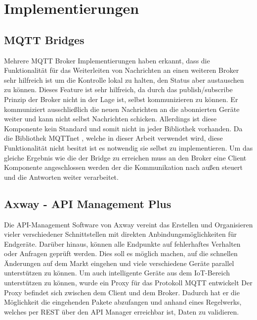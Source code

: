 \section{Implementierungen}
    \subsection{MQTT Bridges}
    Mehrere MQTT Broker Implementierungen \cite{84codes_ab_2016} \cite{light_2019}
    haben erkannt, dass die Funktionalität für das Weiterleiten von Nachrichten an einen weiteren Broker sehr hilfreich ist um die Kontrolle lokal zu halten, den Status aber austauschen zu können. Dieses Feature ist sehr hilfreich, da durch das publish/subscribe Prinzip der Broker nicht in der Lage ist, selbst kommunizieren zu können. Er kommuniziert ausschließlich die neuen Nachrichten an die abonnierten Geräte weiter und kann nicht selbst Nachrichten schicken. Allerdings ist diese Komponente kein Standard und somit nicht in jeder Bibliothek vorhanden.
    Da die Bibliothek MQTTnet \cite{chkr1011_2018},
    welche in dieser Arbeit verwendet wird, diese Funktionalität nicht besitzt ist es notwendig sie selbst zu implementieren. Um das gleiche Ergebnis wie die der Bridge zu erreichen muss an den Broker eine Client Komponente angeschlossen werden der die Kommunikation nach außen steuert und die Antworten weiter verarbeitet. 
    
    \subsection{Axway - API Management Plus}
    Die API-Management Software von Axway vereint das Erstellen und Organisieren vieler verschiedener Schnittstellen mit direkten Anbindungsmöglichkeiten für Endgeräte. Darüber hinaus, können alle Endpunkte auf fehlerhaftes Verhalten oder Anfragen geprüft werden. Dies soll es möglich machen, auf die schnellen Änderungen auf dem Markt eingehen und viele verschiedene Geräte parallel unterstützen zu können.
    Um auch intelligente Geräte aus dem \ac{IoT}-Bereich unterstützen zu können, wurde ein Proxy für das Protokoll \ac{MQTT} entwickelt \cite{axway_2018} Der Proxy befindet sich zwischen dem Client und dem Broker. Dadurch hat er die Möglichkeit die eingehenden Pakete abzufangen und anhand eines Regelwerks, welches per REST über den API Manager erreichbar ist, Daten zu validieren.
    
